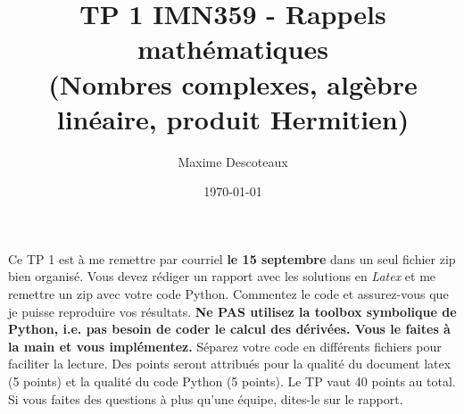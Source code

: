 \documentclass{article}
\title{TP 1 IMN359 - Rappels mathématiques \\
(Nombres complexes, algèbre linéaire, produit Hermitien)}
\author{Maxime Descoteaux}
\date{\today}
\begin{document}
\maketitle

Ce TP 1 est à me remettre par courriel {\bf le 15 septembre} 
dans un seul fichier zip bien organisé. 
Vous devez rédiger un rapport avec les solutions en 
\emph{Latex} et me remettre un zip avec votre code Python. Commentez
le code et assurez-vous que je puisse reproduire vos 
résultats. {\bf Ne PAS utilisez la toolbox symbolique de Python,
  i.e. pas besoin de coder le calcul des dérivées. Vous le faites à la
main et vous implémentez.}
Séparez votre code en différents fichiers pour faciliter la
lecture. Des points seront attribués pour la qualité du document latex
(5 points) et la qualité du code Python (5 points). Le TP vaut 40
points au total. Si vous faites des questions à plus qu'une équipe,
dites-le sur le rapport. 
\end{document}

